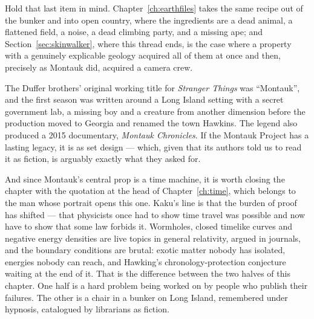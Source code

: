 Hold that last item in mind. Chapter~\ref{ch:earthfiles} takes the same recipe out of the bunker
and into open country, where the ingredients are a dead animal, a flattened field, a noise, a
dead climbing party, and a missing ape; and Section~\ref{sec:skinwalker}, where this thread ends,
is the case where a property with a genuinely explicable geology acquired all of them at once
and then, precisely as Montauk did, acquired a camera crew.

\begin{funfact}
The Duffer brothers' original working title for \emph{Stranger Things} was ``Montauk'', and the
first season was written around a Long Island setting with a secret government lab, a missing
boy and a creature from another dimension before the production moved to Georgia and renamed
the town Hawkins. The legend also produced a 2015 documentary, \emph{Montauk Chronicles}. If
the Montauk Project has a lasting legacy, it is as set design --- which, given that its authors
told us to read it as fiction, is arguably exactly what they asked for.
\end{funfact}

And since Montauk's central prop is a time machine, it is worth closing the chapter with the
quotation at the head of Chapter~\ref{ch:time}, which belongs to the man whose portrait opens this
one. Kaku's line is that the burden of proof has shifted --- that physicists once had to show time
travel was possible and now have to show that some law forbids it. 
Wormholes, closed timelike curves and negative energy densities are live topics in general
relativity, argued in journals, and the boundary conditions are brutal: exotic matter nobody has
isolated, energies nobody can reach, and Hawking's chronology-protection conjecture waiting at the
end of it. That is the difference between the two halves of this chapter. One half is a hard
problem being worked on by people who publish their failures. The other is a chair in a bunker on
Long Island, remembered under hypnosis, catalogued by librarians as fiction.

